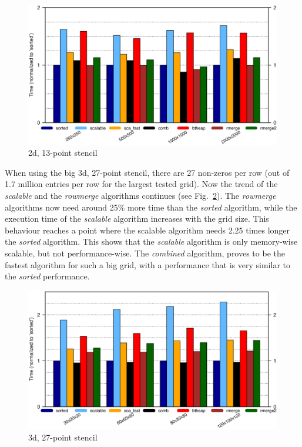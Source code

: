 \begin{figure}[tbp]
	\centering
	\includegraphics[width=1.1\textwidth, trim={0 7.3cm 0 1cm},clip]{seq_2d13point}
	\caption{2d, 13-point stencil} 
	\label{fig:seq2d13point}
\end{figure}


When using the big 3d, 27-point stencil, there are 27 non-zeros per row (out of 1.7 million entries per row for the largest tested grid). Now the trend of the \textit{scalable} and the \textit{rowmerge} algorithms continues (see Fig.~\ref{fig:seq3d27point}). The \textit{rowmerge} algorithms now need around 25\% more time than the \textit{sorted} algorithm, while the execution time of the \textit{scalable} algorithm increases with the grid size. This behaviour reaches a point where the scalable algorithm needs 2.25 times longer the \textit{sorted} algorithm. This shows that the \textit{scalable} algorithm is only memory-wise scalable, but not performance-wise. The \textit{combined} algorithm, proves to be the fastest algorithm for such a big grid, with a performance that is very similar to the \textit{sorted} performance. 

\begin{figure}[tbp]
	\centering
	\includegraphics[width=1.05\textwidth, trim={0 7.3cm 0 1cm},clip]{seq_3d27point}
	\caption{3d, 27-point stencil} 
	\label{fig:seq3d27point}
\end{figure}

